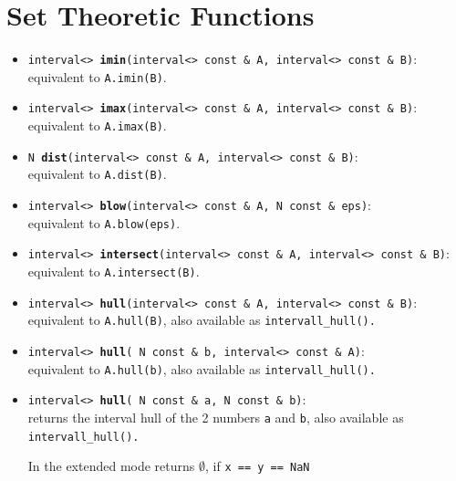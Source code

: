 \documentclass{report}
\begin{document}
\section{Set Theoretic Functions}	
\begin{itemize}
	\item
			\texttt{interval<> {\bf imin}(interval<> const \& A, interval<> const \& B)}:\\
				equivalent to \texttt{A.imin(B)}.
		\item
			\texttt{interval<> {\bf imax}(interval<> const \& A, interval<> const \& B)}:\\
				equivalent to \texttt{A.imax(B)}.
		\item
			\texttt{N {\bf dist}(interval<> const \& A, interval<> const \& B)}:\\
				equivalent to \texttt{A.dist(B)}.
		\item
			\texttt{interval<> {\bf blow}(interval<> const \& A, N const \& eps)}:\\
				equivalent to \texttt{A.blow(eps)}.
		\item
			\texttt{interval<> {\bf intersect}(interval<> const \& A, interval<> const \& B)}:\\
				equivalent to \texttt{A.intersect(B)}.
		\item
			\texttt{interval<> {\bf hull}(interval<> const \& A, interval<> const \& B)}:\\
				equivalent to \texttt{A.hull(B)}, 
				also
				available as \texttt{intervall\_hull().}
		\item
			\texttt{interval<> {\bf hull}( N const \& b, interval<> const \& A)}:\\
				equivalent to \texttt{A.hull(b)},
				also
				available as \texttt{intervall\_hull().}
		\item
			\texttt{interval<> {\bf hull}( N const \& a, N const \& b)}:\\
				returns the interval hull of the 2
			numbers \texttt{a} 
				and \texttt{b},
				also
				available as \texttt{intervall\_hull().}

			In the extended mode returns 
			$	\emptyset$, if \texttt{x == y == NaN}
				

\end{itemize}
\end{document}
